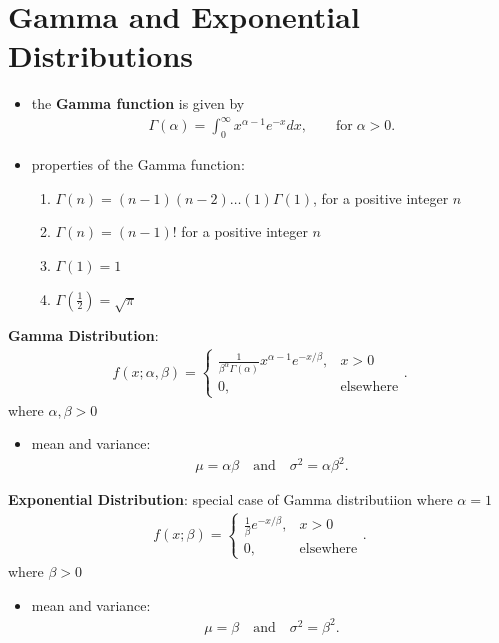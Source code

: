\documentclass[10pt]{article}
\begin{document}
\section{Gamma and Exponential Distributions}
\begin{itemize}
    \item the \textbf{Gamma function} is given by 
        \begin{gather*}
            \Gamma(\alpha)  = \int_{0}^{\infty} x^{\alpha-1}e^{-x} dx, \quad \quad \text{for} \; \alpha > 0
        .\end{gather*}
    \item properties of the Gamma function:
        \begin{enumerate}
            \item $\Gamma(n) = (n-1)(n-2)\ldots(1)\Gamma(1)$, for a positive integer $n$
            \item  $\Gamma(n) = (n-1)!$ for a positive integer $n$
            \item  $\Gamma(1) = 1$ 
            \item $\Gamma(\frac{1}{2}) = \sqrt{\pi} $
        \end{enumerate}
\end{itemize}
\begin{definition}
    \textbf{Gamma Distribution}:
    \begin{gather*}
        f(x;\alpha, \beta) = \begin{cases}
            \frac{1}{\beta^\alpha \Gamma(\alpha)}x^{\alpha-1}e^{-x / \beta}, & x>0 \\ 
            0, & \text{elsewhere}
        \end{cases}
    .\end{gather*}
    where $\alpha,\beta > 0$
    \begin{itemize}
        \item mean and variance: 
            \begin{gather*}
                \mu = \alpha \beta \quad \text{and} \quad \sigma^2 = \alpha \beta^2
            .\end{gather*}
    \end{itemize}
\end{definition}
\begin{definition}
    \textbf{Exponential Distribution}: special case of Gamma distributiion where $\alpha = 1$
     \begin{gather*}
        f(x;\beta) = \begin{cases}
            \frac{1}{\beta}e^{-x / \beta}, & x>0 \\ 
            0, & \text{elsewhere}
        \end{cases}
    .\end{gather*}
    where $\beta > 0$
    \begin{itemize}
        \item mean and variance: 
            \begin{gather*}
                \mu = \beta \quad \text{and} \quad \sigma^2 = \beta^2
            .\end{gather*}
    \end{itemize}
\end{definition}
\end{document}
